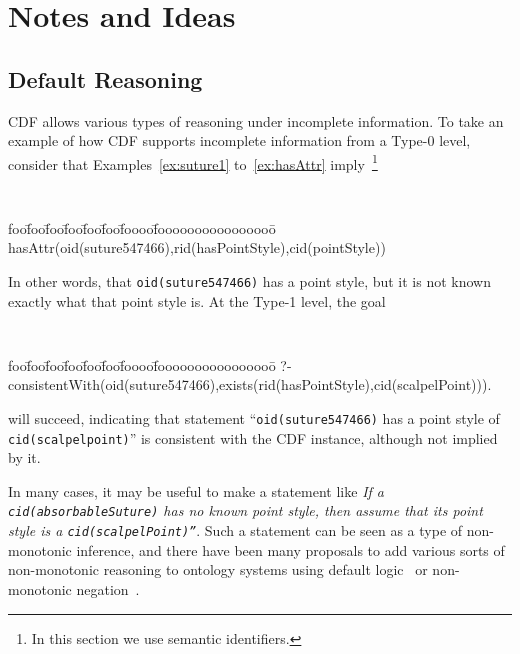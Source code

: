 \chapter{Notes and Ideas}

\section{Default Reasoning}

CDF allows various types of reasoning under incomplete information.
To take an example of how CDF supports incomplete information from a
Type-0 level, consider that Examples~\ref{ex:suture1}
to~\ref{ex:hasAttr} imply~\footnote{
In this section we use semantic identifiers.}
{\small {\tt 
\begin{tabbing}
foo\=foo\=foo\=foo\=foo\=foo\=foooo\=foooooooooooooooo\=\kill
\> hasAttr(oid(suture547466),rid(hasPointStyle),cid(pointStyle))
\end{tabbing}
} }
%
\noindent
In other words, that {\tt oid(suture547466)} has a point style, but it
is not known exactly what that point style is.  At the Type-1 level,
the goal
{\small {\tt 
\begin{tabbing}
foo\=foo\=foo\=foo\=foo\=foo\=foooo\=foooooooooooooooo\=\kill
\> ?-
consistentWith(oid(suture547466),exists(rid(hasPointStyle),cid(scalpelPoint))).
\end{tabbing}
} }
%
\noindent
will succeed, indicating that statement ``{\tt oid(suture547466)}
has a point style of {\tt cid(scalpelpoint)}'' is consistent with the
CDF instance, although not implied by it.  

In many cases, it may be useful to make a statement like {\em If a
{\tt cid(absorbableSuture)} has no known point style, then assume that
its point style is a {\tt cid(scalpelPoint)''}}.  Such a statement can
be seen as a type of non-monotonic inference, and there have been many
proposals to add various sorts of non-monotonic reasoning to ontology
systems using default logic~\cite{BaaH95,BaaH95a} or non-monotonic
negation~\cite{KiLW95}.  

